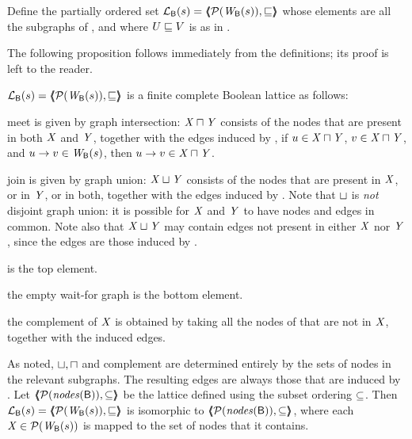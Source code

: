 \begin{definition} \label{defn:wflattice}
Define the partially ordered set $\lat{\B}{s} = \tpl{ \wfgS{\B}{s}, \subg }$ %
whose elements are all the subgraphs of 
, and where  $U \subg V$ is as in .   
\end{definition}

The following proposition follows immediately from the definitions; its proof is left to the reader.
\begin{proposition} \label{prop:isALattice}
$\lat{\B}{s} = \tpl{ \wfgS{\B}{s}, \subg }$ is a finite complete Boolean lattice as follows:
\be

\item meet is given by graph intersection: 
$\XS \meet \YS$ consists of the nodes that are present in both $\XS$ and $\YS$, together with the edges induced by , 
\ie if $u \in \XS \meet \YS$, $v \in \XS \meet \YS$, and $u \ar v \in  \wfg{\B}{s}$, then $u \ar v \in  \XS \meet \YS$.

\item join is given by graph union: $\XS \join \YS$ consists of the nodes that are present in $\XS$, or in $\YS$, or in both, together with 
 the edges induced by .
 Note that $\join$ is \emph{not} disjoint graph union: 
it is possible for $\XS$ and $\YS$ to have nodes and edges in common. Note also that $\XS \join \YS$ may contain edges not present in either $\XS$ nor $\YS$,
since the edges are those induced by . 

\item {}  is the top element.

\item  the empty wait-for graph \ewfg is the bottom element.

\item the complement \compl{\XS} of $\XS$ is obtained by taking all the nodes of  that are not in $\XS$, together with the induced edges.
\ee
\end{proposition}
%
As noted, $\join, \meet$ and complement are determined entirely by the sets of nodes in the relevant subgraphs. The resulting edges are always those
that are induced by .
Let $\tpl{ \nodesPow{\B}, \sub }$ be the lattice defined using the subset ordering $\sub$. 
Then $\lat{\B}{s} = \tpl{ \wfgPow{\B}{s}, \subg }$ is isomorphic to $\tpl{ \nodesPow{\B}, \sub }$, 
where each $\XS \in \wfgPow{\B}{s}$ is mapped to the set of nodes that it contains.


